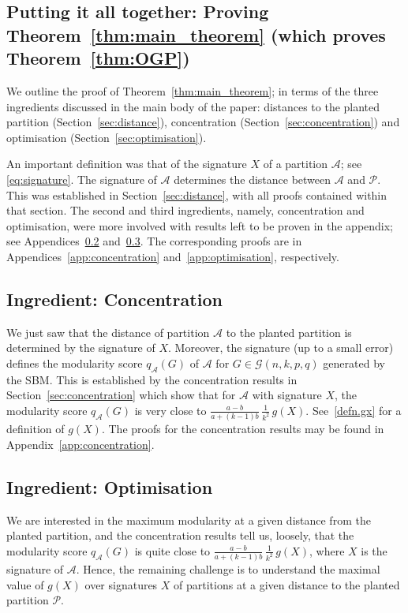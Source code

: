 \documentclass[a4paper,UKenglish,cleveref, autoref, thm-restate,numberwithinsect]{lipics-v2021}
\newcommand{\cA}{\mathcal{A}}
\newcommand{\cP}{\mathcal{P}}
\begin{document}
\subsection{Putting it all together: Proving Theorem~\ref{thm:main_theorem} (which proves Theorem~\ref{thm:OGP})}\label{subsec:steps_to_prove_max_mod}


We outline the proof of Theorem~\ref{thm:main_theorem}; in terms of the three ingredients discussed in the main body of the paper: distances to the planted partition (Section~\ref{sec:distance}), concentration (Section~\ref{sec:concentration}) and optimisation (Section~\ref{sec:optimisation}).  

An important definition was that of the signature $X$ of a partition $\cA$; see \eqref{eq:signature}.
The signature of $\cA$ determines the distance between $\cA$ and $\cP$. This was established in Section~\ref{sec:distance}, with all proofs contained within that section. The second and third ingredients, namely, concentration and optimisation, were more involved with results left to be proven in the appendix; see Appendices~\ref{subsec:describe_concentration} and~\ref{sec:figures_and_calcs_for_figures}. The corresponding proofs are in Appendices~\ref{app:concentration} and~\ref{app:optimisation}, respectively.


\subsection{Ingredient: Concentration}\label{subsec:describe_concentration}

We just saw that the distance of partition $\cA$ to the planted partition is determined by the signature of $X$.
Moreover, the signature (up to a small error) defines the modularity score $q_\cA(G)$ of $\cA$ for $G \in \mathcal{G}(n,k,p,q)$ generated by the SBM. This is established by the concentration results in Section~\ref{sec:concentration} which show that for $\cA$ with signature $X$, the modularity score $q_\cA(G)$ is very close to $\frac{a-b}{a+(k-1)b}\,\frac{1}{k^2}\,g(X)$. See~\eqref{defn.gx} for a definition of $g(X)$. 
%
The proofs for the concentration results may be found in Appendix~\ref{app:concentration}.


\subsection{Ingredient: Optimisation}\label{sec:figures_and_calcs_for_figures}

We are interested in the maximum modularity at a given distance from the planted partition, and the concentration results tell us, loosely, that the modularity score $q_\cA(G)$ is quite close to $\frac{a-b}{a+(k-1)b}\,\frac{1}{k^2}\,g(X)$, where $X$ is the signature of $\cA$. Hence, the remaining challenge is to understand the maximal value of $g(X)$ over signatures $X$ of partitions at a given distance to the planted partition $\cP$. 
\end{document}
